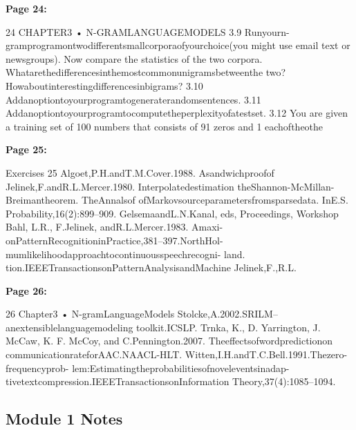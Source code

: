 \documentclass[11pt,a4paper]{article}
\begin{document}
\textbf{Page 24:}

24 CHAPTER3 • N-GRAMLANGUAGEMODELS
3.9 Runyourn-gramprogramontwodifferentsmallcorporaofyourchoice(you
might use email text or newsgroups). Now compare the statistics of the two
corpora. Whatarethedifferencesinthemostcommonunigramsbetweenthe
two? Howaboutinterestingdifferencesinbigrams?
3.10 Addanoptiontoyourprogramtogeneraterandomsentences.
3.11 Addanoptiontoyourprogramtocomputetheperplexityofatestset.
3.12 You are given a training set of 100 numbers that consists of 91 zeros and 1
eachoftheothe

\textbf{Page 25:}

Exercises 25
Algoet,P.H.andT.M.Cover.1988. Asandwichproofof Jelinek,F.andR.L.Mercer.1980. Interpolatedestimation
theShannon-McMillan-Breimantheorem. TheAnnalsof ofMarkovsourceparametersfromsparsedata. InE.S.
Probability,16(2):899–909. GelsemaandL.N.Kanal, eds, Proceedings, Workshop
Bahl, L.R., F.Jelinek, andR.L.Mercer.1983. Amaxi- onPatternRecognitioninPractice,381–397.NorthHol-
mumlikelihoodapproachtocontinuousspeechrecogni- land.
tion.IEEETransactionsonPatternAnalysisandMachine Jelinek,F.,R.L.

\textbf{Page 26:}

26 Chapter3 • N-gramLanguageModels
Stolcke,A.2002.SRILM–anextensiblelanguagemodeling
toolkit.ICSLP.
Trnka, K., D. Yarrington, J. McCaw, K. F. McCoy, and
C.Pennington.2007. Theeffectsofwordpredictionon
communicationrateforAAC.NAACL-HLT.
Witten,I.H.andT.C.Bell.1991.Thezero-frequencyprob-
lem:Estimatingtheprobabilitiesofnoveleventsinadap-
tivetextcompression.IEEETransactionsonInformation
Theory,37(4):1085–1094.


\subsection{Module 1 Notes}
\end{document}
